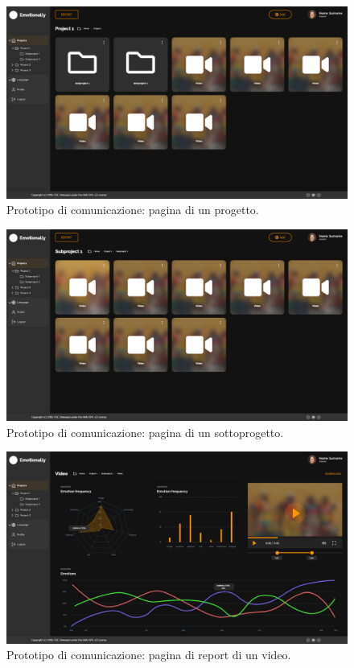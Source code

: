 \begin{figure}[H]
	\centering
	\caption{Prototipo di comunicazione: pagina di un progetto.}
	\label{fig:prototipo-comunicazione:project}
	\includegraphics[width=\textwidth]{images/prototipo-comunicazione/project.png}
\end{figure}

\begin{figure}[H]
	\centering
	\caption{Prototipo di comunicazione: pagina di un sottoprogetto.}
	\label{fig:prototipo-comunicazione:subproject}
	\includegraphics[width=\textwidth]{images/prototipo-comunicazione/subproject.png}
\end{figure}

\begin{figure}[H]
	\centering
	\caption{Prototipo di comunicazione: pagina di report di un video.}
	\label{fig:prototipo-comunicazione:video-report}
	\includegraphics[width=\textwidth]{images/prototipo-comunicazione/report-video.png}
\end{figure}

